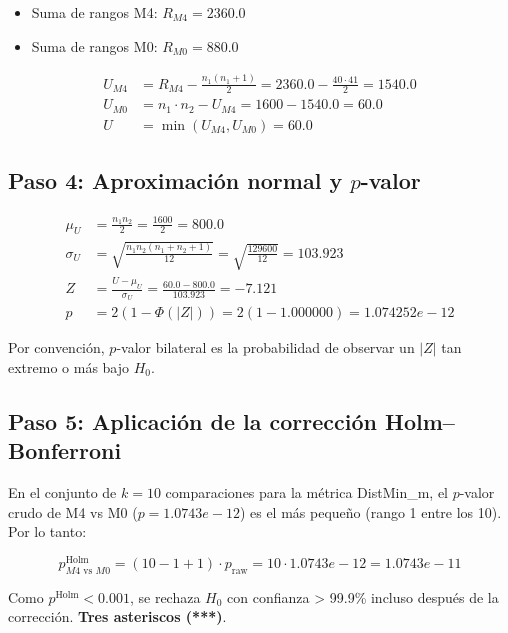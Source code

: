 \documentclass[12pt,a4paper,oneside]{book}
\begin{document}
\begin{itemize}
    \item Suma de rangos M4: $R_{M4} = 2360.0$
    \item Suma de rangos M0: $R_{M0} = 880.0$
\end{itemize}

\begin{align}
U_{M4} &= R_{M4} - \frac{n_1(n_1+1)}{2} = 2360.0 - \frac{40\cdot41}{2} = 1540.0 \\
U_{M0} &= n_1\cdot n_2 - U_{M4} = 1600 - 1540.0 = 60.0\\
U &= \min(U_{M4}, U_{M0}) = 60.0
\end{align}

\subsection{Paso 4: Aproximación normal y $p$-valor}

\begin{align}
\mu_U &= \frac{n_1 n_2}{2} = \frac{1600}{2} = 800.0\\
\sigma_U &= \sqrt{\frac{n_1 n_2 (n_1+n_2+1)}{12}} = \sqrt{\frac{129600}{12}} = 103.923\\
Z &= \frac{U - \mu_U}{\sigma_U} = \frac{60.0 - 800.0}{103.923} = -7.121\\
p &= 2(1 - \Phi(|Z|)) = 2(1 - 1.000000) = 1.074252e-12
\end{align}

Por convención, $p$-valor bilateral es la probabilidad de observar un $|Z|$ tan extremo o más bajo $H_0$.

\subsection{Paso 5: Aplicación de la corrección Holm--Bonferroni}

En el conjunto de $k=10$ comparaciones para la métrica DistMin\_m, el $p$-valor crudo de M4 vs M0 ($p=1.0743e-12$) es el más pequeño (rango 1 entre los 10). Por lo tanto:

\begin{equation}
p^{\text{Holm}}_{M4 \text{ vs } M0} = (10 - 1 + 1) \cdot p_{\text{raw}} = 10 \cdot 1.0743e-12 = 1.0743e-11
\end{equation}

Como $p^{\text{Holm}} < 0.001$, se rechaza $H_0$ con confianza > 99.9\% incluso después de la corrección. \textbf{Tres asteriscos (***)}.

\newpage
\end{document}
